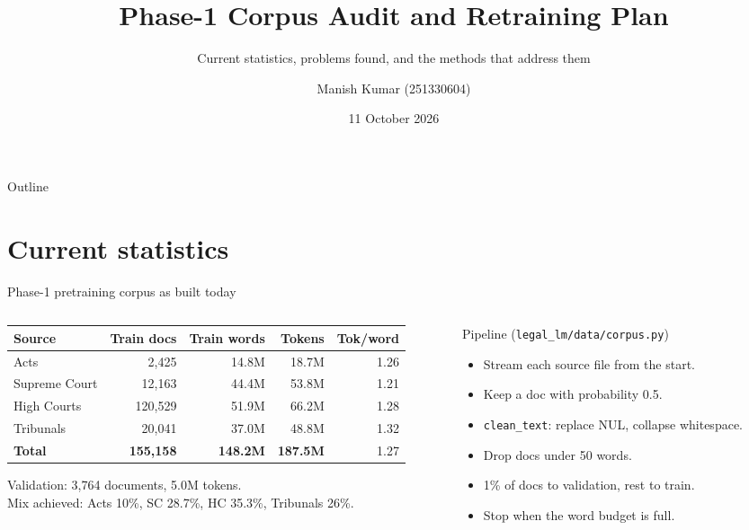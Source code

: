 \documentclass[aspectratio=169,11pt]{beamer}
\title[CS-781: data audit and retraining plan]{Phase-1 Corpus Audit and Retraining Plan}
\subtitle{Current statistics, problems found, and the methods that address them}
\author[Manish Kumar]{Manish Kumar (251330604)}
\institute{CS-781, IIT Kanpur}
\date{11 October 2026}
\newcommand{\code}[1]{\texttt{\small #1}}
\begin{document}
\begin{frame}
  \titlepage
\end{frame}

\begin{frame}{Outline}
  \begin{multicols}{2}
  \tableofcontents
  \end{multicols}
\end{frame}

\section{Current statistics}

\begin{frame}{Phase-1 pretraining corpus as built today}
  \begin{columns}[T]
    \begin{column}{0.58\textwidth}
      \footnotesize
      \begin{tabular}{lrrrr}
        \toprule
        Source & Train docs & Train words & Tokens & Tok/word \\
        \midrule
        Acts           &   2{,}425 & 14.8M & 18.7M & 1.26 \\
        Supreme Court  &  12{,}163 & 44.4M & 53.8M & 1.21 \\
        High Courts    & 120{,}529 & 51.9M & 66.2M & 1.28 \\
        Tribunals      &  20{,}041 & 37.0M & 48.8M & 1.32 \\
        \midrule
        \textbf{Total} & \textbf{155{,}158} & \textbf{148.2M} & \textbf{187.5M} & 1.27 \\
        \bottomrule
      \end{tabular}

      \vspace{2mm}
      Validation: 3{,}764 documents, 5.0M tokens.\\
      Mix achieved: Acts 10\%, SC 28.7\%, HC 35.3\%, Tribunals 26\%.
    \end{column}
    \begin{column}{0.40\textwidth}
      \footnotesize
      \begin{block}{Pipeline (\code{legal\_lm/data/corpus.py})}
        \begin{itemize}
          \item Stream each source file from the start.
          \item Keep a doc with probability 0.5.
          \item \code{clean\_text}: replace NUL, collapse whitespace.
          \item Drop docs under 50 words.
          \item 1\% of docs to validation, rest to train.
          \item Stop when the word budget is full.
        \end{itemize}
      \end{block}
    \end{column}
  \end{columns}
\end{frame}
\end{document}
